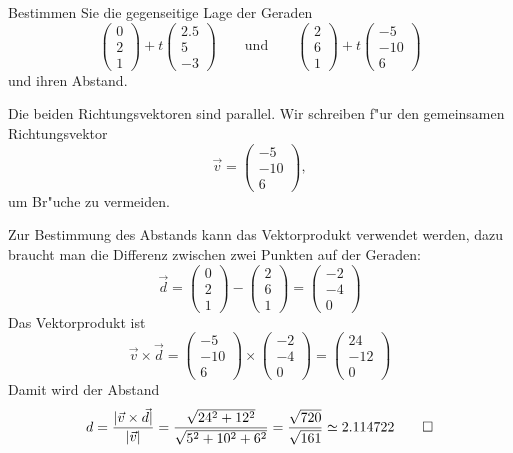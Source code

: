 Bestimmen Sie die gegenseitige Lage der Geraden
\[
\begin{pmatrix}0\\2\\1\end{pmatrix}
+t
\begin{pmatrix}2.5\\5\\-3\end{pmatrix}
\qquad
\text{und}
\qquad
\begin{pmatrix}2\\6\\1\end{pmatrix}
+t
\begin{pmatrix}-5\\-10\\6\end{pmatrix}
\]
und ihren Abstand.

\begin{loesung}
Die beiden Richtungsvektoren sind parallel.
Wir schreiben f"ur den gemeinsamen Richtungsvektor
\[
\vec v=
\begin{pmatrix}-5\\-10\\6\end{pmatrix},
\]
um Br"uche zu vermeiden.

Zur Bestimmung des
Abstands kann das Vektorprodukt verwendet werden, dazu braucht man
die Differenz zwischen zwei Punkten auf der Geraden:
\[
\vec d=
\begin{pmatrix}0\\2\\1\end{pmatrix}
-\begin{pmatrix}2\\6\\1\end{pmatrix}
=
\begin{pmatrix}-2\\-4\\0\end{pmatrix}
\]
Das Vektorprodukt ist
\[
\vec v\times \vec d
=
\begin{pmatrix}-5\\-10\\6\end{pmatrix}
\times
\begin{pmatrix}-2\\-4\\0\end{pmatrix}
=
\begin{pmatrix}24\\-12\\0\end{pmatrix}
\]
Damit wird der Abstand
\begin{align*}
d
=
\frac{|\vec v\times \vec d|}{|\vec v|}
=\frac{\sqrt{24^2+12^2}}{\sqrt{5^2+10^2+6^2}}
=\frac{\sqrt{720}}{\sqrt{161}}
\simeq 2.114722
\qedhere
\end{align*}
\end{loesung}

